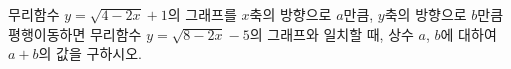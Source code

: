 무리함수 $y=\sqrt{4-2x}+1$의 그래프를 $x$축의 방향으로 $a$만큼, $y$축의 방향으로 $b$만큼 평행이동하면 무리함수 $y=\sqrt{8-2x}-5$의 그래프와 일치할 때, 상수 $a$, $b$에 대하여 $a+b$의 값을 구하시오.
